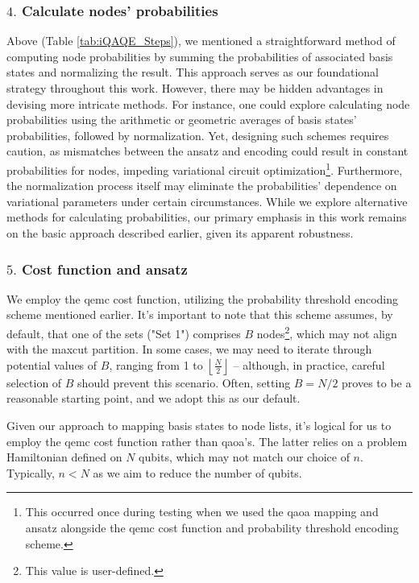 \subsubsection*{$4.$ Calculate nodes' probabilities}
Above (Table \ref{tab:iQAQE_Steps}), we mentioned a straightforward method of computing node probabilities by summing the probabilities of associated basis states and normalizing the result. This approach serves as our foundational strategy throughout this work. However, there may be hidden advantages in devising more intricate methods. For instance, one could explore calculating node probabilities using the arithmetic or geometric averages of basis states' probabilities, followed by normalization. Yet, designing such schemes requires caution, as mismatches between the ansatz and encoding could result in constant probabilities for nodes, impeding variational circuit optimization\footnote{This occurred once during testing when we used the \acrshort{qaoa} mapping and ansatz alongside the \acrshort{qemc} cost function and probability threshold encoding scheme.}. Furthermore, the normalization process itself may eliminate the probabilities' dependence on variational parameters under certain circumstances. While we explore alternative methods for calculating probabilities, our primary emphasis in this work remains on the basic approach described earlier, given its apparent robustness.

\subsubsection*{$5.$ Cost function and ansatz}
We employ the \acrshort{qemc} cost function, utilizing the probability threshold encoding scheme mentioned earlier. It's important to note that this scheme assumes, by default, that one of the sets ("Set 1") comprises $B$ nodes\footnote{This value is user-defined.}, which may not align with the \acrshort{maxcut} partition. In some cases, we may need to iterate through potential values of $B$, ranging from 1 to $\left\lfloor{\frac{N}{2}}\right\rfloor$ – although, in practice, careful selection of $B$ should prevent this scenario. Often, setting $B = N/2$ proves to be a reasonable starting point, and we adopt this as our default.

Given our approach to mapping basis states to node lists, it's logical for us to employ the \acrshort{qemc} cost function rather than \acrshort{qaoa}'s. The latter relies on a problem Hamiltonian defined on $N$ qubits, which may not match our choice of $n$. Typically, $n < N$ as we aim to reduce the number of qubits. %

